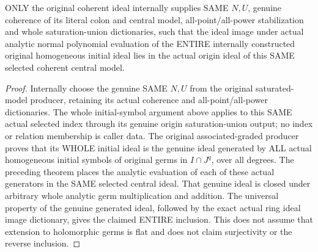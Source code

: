 \begin{theorem}
\label{hir:relative-normal-deformation-entire-initial-ideal-inclusion}
\leanok
{}
ONLY the original coherent ideal internally supplies SAME $N,U$, genuine
coherence of its literal colon and central model, all-point/all-power
stabilization and whole saturation-union dictionaries, such that the ideal
image under actual analytic normal polynomial evaluation of the ENTIRE
internally constructed original homogeneous initial ideal lies in the
actual origin ideal of this SAME selected coherent central model.
\end{theorem}
\begin{proof}
Internally choose the genuine SAME $N,U$ from the original saturated-model
producer, retaining its actual coherence and all-point/all-power dictionaries.
The whole initial-symbol argument above applies to this SAME actual selected
index through its genuine origin saturation-union output; no index or
relation membership is caller data.
The original associated-graded producer proves that its WHOLE initial ideal
is the genuine ideal generated by ALL actual homogeneous initial symbols
of original germs in $I\cap J^q$, over all degrees. The preceding theorem
places the analytic evaluation of each of these actual generators in the
SAME selected central ideal. That genuine ideal is closed under arbitrary
whole analytic germ multiplication and addition. The universal property of
the genuine generated ideal, followed by the exact actual ring ideal image
dictionary, gives the claimed ENTIRE inclusion. This does not assume that
extension to holomorphic germs is flat and does not claim surjectivity or
the reverse inclusion.
\end{proof}

